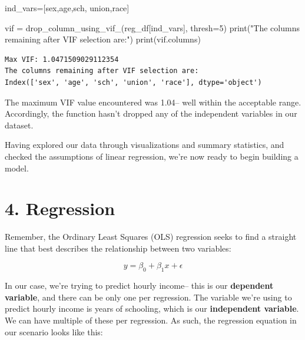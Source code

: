 \documentclass[
  letterpaper,
  DIV=11,
  numbers=noendperiod]{scrreprt}
\newenvironment{Shaded}{\begin{snugshade}}{\end{snugshade}}
\newcommand{\BuiltInTok}[1]{\textcolor[rgb]{0.00,0.23,0.31}{#1}}
\newcommand{\DecValTok}[1]{\textcolor[rgb]{0.68,0.00,0.00}{#1}}
\newcommand{\NormalTok}[1]{\textcolor[rgb]{0.00,0.23,0.31}{#1}}
\newcommand{\OperatorTok}[1]{\textcolor[rgb]{0.37,0.37,0.37}{#1}}
\newcommand{\StringTok}[1]{\textcolor[rgb]{0.13,0.47,0.30}{#1}}
\begin{document}
\begin{Shaded}
\begin{Highlighting}[]
\NormalTok{ind\_vars}\OperatorTok{=}\NormalTok{[}\StringTok{\textquotesingle{}sex\textquotesingle{}}\NormalTok{,}\StringTok{\textquotesingle{}age\textquotesingle{}}\NormalTok{,}\StringTok{\textquotesingle{}sch\textquotesingle{}}\NormalTok{, }\StringTok{\textquotesingle{}union\textquotesingle{}}\NormalTok{,}\StringTok{\textquotesingle{}race\textquotesingle{}}\NormalTok{]}

\NormalTok{vif }\OperatorTok{=}\NormalTok{ drop\_column\_using\_vif\_(reg\_df[ind\_vars], thresh}\OperatorTok{=}\DecValTok{5}\NormalTok{)}
\BuiltInTok{print}\NormalTok{(}\StringTok{"The columns remaining after VIF selection are:"}\NormalTok{)}
\BuiltInTok{print}\NormalTok{(vif.columns)}
\end{Highlighting}
\end{Shaded}

\begin{verbatim}
Max VIF: 1.0471509029112354
The columns remaining after VIF selection are:
Index(['sex', 'age', 'sch', 'union', 'race'], dtype='object')
\end{verbatim}

The maximum VIF value encountered was 1.04-- well within the acceptable
range. Accordingly, the function hasn't dropped any of the independent
variables in our dataset.

Having explored our data through visualizations and summary statistics,
and checked the assumptions of linear regression, we're now ready to
begin building a model.

\hypertarget{regression-1}{%
\section{4. Regression}\label{regression-1}}

Remember, the Ordinary Least Squares (OLS) regression seeks to find a
straight line that best describes the relationship between two
variables:

\[y= \beta_0 + \beta_1x+\epsilon \]

In our case, we're trying to predict hourly income-- this is our
\textbf{dependent variable}, and there can be only one per regression.
The variable we're using to predict hourly income is years of schooling,
which is our \textbf{independent variable}. We can have multiple of
these per regression. As such, the regression equation in our scenario
looks like this:
\end{document}
